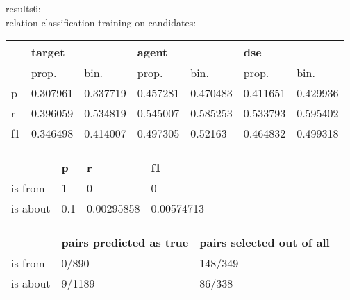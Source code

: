 \documentclass[a4paper, 12pt]{article}
\begin{document}
results6:\\
relation classification training on candidates:\\
\begin{table}[h!]
\centering
\begin{tabular}{l|ll|ll|ll}
\hline
   & \multicolumn{2}{l}{target} & \multicolumn{2}{l}{agent} & \multicolumn{2}{l}{dse} \\ \hline
   & prop.& bin.& prop.& bin.& prop.& bin.\\
 \hline
p  &0.307961&0.337719& 0.457281 & 0.470483 &0.411651  & 0.429936  \\
r  &0.396059&0.534819& 0.545007 & 0.585253 &0.533793  & 0.595402  \\
f1 &0.346498&0.414007& 0.497305 &  0.52163 &0.464832  & 0.499318  \\ \hline
\end{tabular}
\centering
\begin{tabular}{l|l|l|l}
\hline
         & p & r & f1    \\\hline
is from  & 1& 0& 0\\
is about &0.1& 0.00295858& 0.00574713 \\
\hline
\end{tabular}
\begin{tabular}{l|l|l}
\hline
         & pairs predicted as true & pairs selected out of all\\\hline
is from  & 0/890& 148/349 \\
is about & 9/1189& 86/338\\
\hline
\end{tabular}
\end{table}
\end{document}
